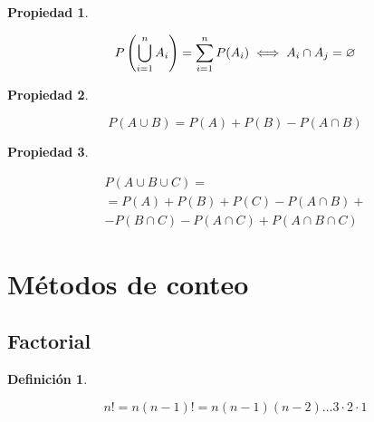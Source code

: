\documentclass[a5paper,12pt,twoside]{book}
\newtheorem{defn}{{Definición}}[chapter]
\newtheorem{prop}{{Propiedad}}[chapter]
\begin{document}
\begin{mdframed}[style=MyFrame1]
    \begin{prop}
    \end{prop}
    \begin{equation*}
        P \left( \bigcup_{i=1}^n A_i \right) = \sum_{i=1}^n P(A_i)
        \iff A_i \cap A_j = \varnothing
    \end{equation*}
\end{mdframed}

\begin{mdframed}[style=MyFrame1]
    \begin{prop}
    \end{prop}
    \begin{equation*}
        P(A \cup B) = P(A) + P(B) - P(A \cap B)
    \end{equation*}
\end{mdframed}

\begin{mdframed}[style=MyFrame1]
    \begin{prop}
    \end{prop}
    \begin{gather*}
        P (A \cup B \cup C) =
        \\
        =P(A) + P(B) + P(C) - P(A \cap B) +
        \\
        - P(B \cap C) - P(A \cap C) + P(A \cap B \cap C)
    \end{gather*}
\end{mdframed}


\section{Métodos de conteo}


\subsection{Factorial}

\begin{mdframed}[style=MyFrame1]
    \begin{defn}
    \end{defn}
    \begin{equation*}
        n! = n(n-1)! = n(n-1)(n-2) \dots 3 \cdot 2 \cdot 1
    \end{equation*}
\end{mdframed}
\end{document}
